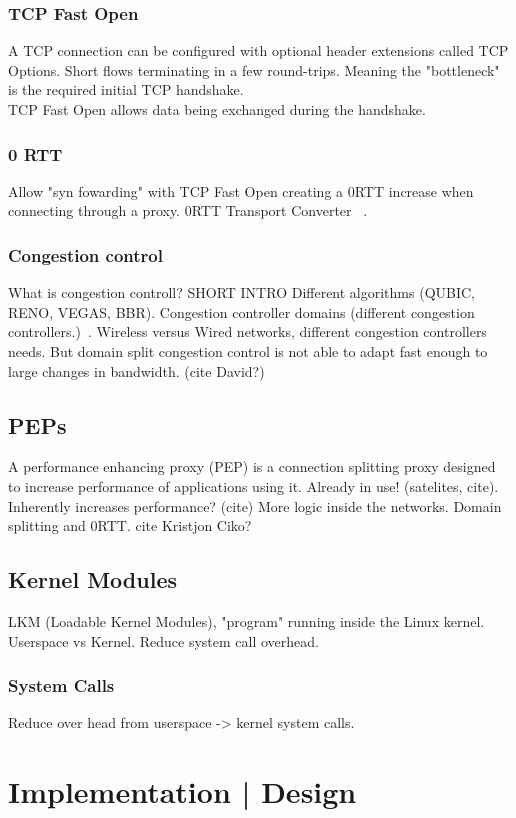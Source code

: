 \documentclass[a4paper,english, 11pt]{report}
\begin{document}
\subsection{TCP Fast Open}
A TCP connection can be configured with optional header extensions called TCP Options. 
Short flows terminating in a few round-trips. Meaning the "bottleneck" is the required initial TCP handshake.\\
TCP Fast Open allows data being exchanged during the handshake. 

\subsection{0 RTT}
Allow "syn fowarding" with TCP Fast Open creating a 0RTT increase when connecting through a proxy.
0RTT Transport Converter ~\cite{rfc8803}.

\subsection{Congestion control}
What is congestion controll? SHORT INTRO
Different algorithms (QUBIC, RENO, VEGAS, BBR).
Congestion controller domains (different congestion controllers.)~\cite{rfc5783}.
Wireless versus Wired networks, different congestion controllers needs.
But domain split congestion control is not able to adapt fast enough to large changes in bandwidth. (cite David?)


\section{PEPs}
A performance enhancing proxy (PEP) is a connection splitting proxy designed to increase performance of applications using it. Already in use! (satelites, cite). Inherently increases performance? (cite)
More logic inside the networks. Domain splitting and 0RTT. {cite Kristjon Ciko?}

\section{Kernel Modules}
LKM (Loadable Kernel Modules), "program" running inside the Linux kernel.
Userspace vs Kernel. Reduce system call overhead.
\subsection{System Calls}
Reduce over head from userspace -> kernel system calls.

\chapter{Implementation | Design}
\end{document}
